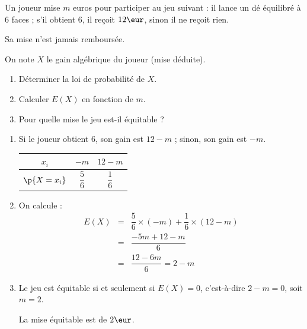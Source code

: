 \begin{methode}
	Un joueur mise $m$ euros pour participer au jeu suivant : il lance un dé équilibré à $6$ faces ; s'il obtient $6$, il reçoit $12\eur$, sinon il ne reçoit rien.

	Sa mise n'est jamais remboursée.

	On note $X$ le gain algébrique du joueur (mise déduite).

	\begin{enumerate}
		\item Déterminer la loi de probabilité de $X$.
		\item Calculer $E(X)$ en fonction de $m$.
		\item Pour quelle mise le jeu est-il équitable ?
	\end{enumerate}

	\begin{correction}
		\nline
		\begin{enumerate}
			\item Si le joueur obtient $6$, son gain est $12 - m$ ; sinon, son gain est $-m$.
			      \begin{center}
				      \begin{tabular}{|c|c|c|} \hline
					      \ccg$x_i$                               & $-m$           & $12 - m$       \\ \hline
					      \ccg\rule[-4mm]{0mm}{11mm}$\p{X = x_i}$ & $\dfrac{5}{6}$ & $\dfrac{1}{6}$ \\ \hline
				      \end{tabular}
			      \end{center}
			\item On calcule :
			      \[
				      \begin{array}{rcl}
					      E(X) & = & \dfrac{5}{6} \times (-m) + \dfrac{1}{6} \times (12 - m) \\[3mm]
					           & = & \dfrac{-5m + 12 - m}{6}                                 \\[3mm]
					           & = & \dfrac{12 - 6m}{6} = 2 - m
				      \end{array}
			      \]
			\item Le jeu est équitable si et seulement si $E(X) = 0$, c'est-à-dire $2 - m = 0$, soit $m = 2$.

			      La mise équitable est de $2\eur$.
		\end{enumerate}
	\end{correction}
\end{methode}


